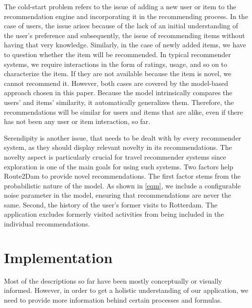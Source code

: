 \documentclass[11pt,a4paper,oneside]{article}
\begin{document}
The cold-start problem refers to the issue of adding a new user or item to the recommendation engine and incorporating it in the recommending process. In the case of users, the issue arises because of the lack of an initial understanding of the user's preference and subsequently, the issue of recommending items without having that very knowledge. Similarly, in the case of newly added items, we have to question whether the item will be recommended. In typical recommender systems, we require interactions in the form of ratings, usage, and so on to characterize the item. If they are not available because the item is novel, we cannot recommend it. However, both cases are covered by the model-based approach chosen in this paper. Because the model intrinsically compares the users' and items' similarity, it automatically generalizes them. Therefore, the recommendations will be similar for users and items that are alike, even if there has not been any user or item interaction, so far. 

Serendipity is another issue, that needs to be dealt with by every recommender system, as they should display relevant novelty in its recommendations. The novelty aspect is particularly crucial for travel recommender systems since exploration is one of the main goals for using such systems. Two factors help Route2Dam to provide novel recommendations. The first factor stems from the probabilistic nature of the model. As shown in \autoref{eqm}, we include a configurable noise parameter in the model, ensuring that recommendations are never the same. Second, the history of the user's former visits to Rotterdam. The application excludes formerly visited activities from being included in the individual recommendations.  


\section{Implementation}
\label{sec:impl}
Most of the descriptions so far have been mostly conceptually or visually informed. However, in order to get a holistic understanding of our application, we need to provide more information behind certain processes and formulas.
\end{document}
